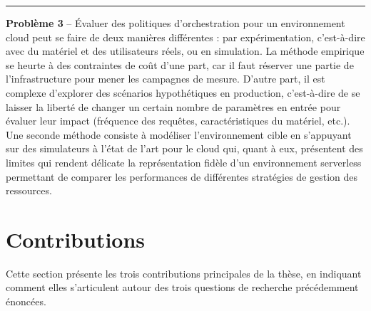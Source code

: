 
\begin{center}
    \rule{4cm}{0.4pt}
\end{center}

\textbf{Problème 3} -- Évaluer des politiques d'orchestration pour un environnement cloud peut se faire de deux manières différentes : par expérimentation, c'est-à-dire avec du matériel et des utilisateurs réels, ou en simulation. La méthode empirique se heurte à des contraintes de coût d'une part, car il faut réserver une partie de l'infrastructure pour mener les campagnes de mesure. D'autre part, il est complexe d'explorer des scénarios hypothétiques en production, c'est-à-dire de se laisser la liberté de changer un certain nombre de paramètres en entrée pour évaluer leur impact (fréquence des requêtes, caractéristiques du matériel, etc.). Une seconde méthode consiste à modéliser l'environnement cible en s'appuyant sur des simulateurs à l'état de l'art pour le cloud qui, quant à eux, présentent des limites qui rendent délicate la représentation fidèle d'un environnement serverless permettant de comparer les performances de différentes stratégies de gestion des ressources.


\section{Contributions}

Cette section présente les trois contributions principales de la thèse, en indiquant comment elles s'articulent autour des trois questions de recherche précédemment énoncées.

